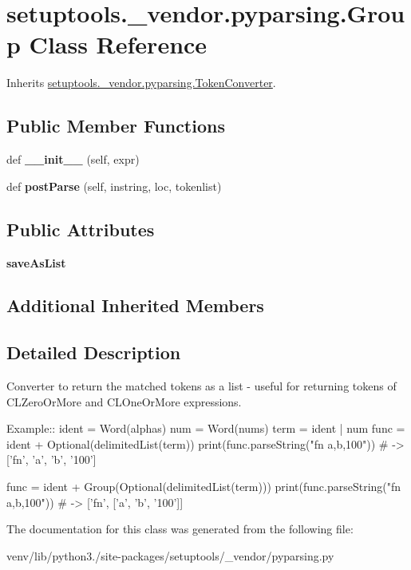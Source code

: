 \hypertarget{classsetuptools_1_1__vendor_1_1pyparsing_1_1_group}{}\section{setuptools.\+\_\+vendor.\+pyparsing.\+Group Class Reference}
\label{classsetuptools_1_1__vendor_1_1pyparsing_1_1_group}


Inherits \hyperlink{classsetuptools_1_1__vendor_1_1pyparsing_1_1_token_converter}{setuptools.\+\_\+vendor.\+pyparsing.\+Token\+Converter}.

\subsection*{Public Member Functions}
\begin{DoxyCompactItemize}
\item 
\mbox{\label{classsetuptools_1_1__vendor_1_1pyparsing_1_1_group_ac8ddd6ac40275611871ddf1ce6eaa6da}} 
def {\bfseries \+\_\+\+\_\+init\+\_\+\+\_\+} (self, expr)
\item 
\mbox{\label{classsetuptools_1_1__vendor_1_1pyparsing_1_1_group_a83c4ae0d82479b6fcac000adab3a3bc3}} 
def {\bfseries post\+Parse} (self, instring, loc, tokenlist)
\end{DoxyCompactItemize}
\subsection*{Public Attributes}
\begin{DoxyCompactItemize}
\item 
\mbox{\label{classsetuptools_1_1__vendor_1_1pyparsing_1_1_group_abb9329fa2f2c5c248c18b80cdd6f39c0}} 
{\bfseries save\+As\+List}
\end{DoxyCompactItemize}
\subsection*{Additional Inherited Members}


\subsection{Detailed Description}
\begin{DoxyVerb}Converter to return the matched tokens as a list - useful for returning tokens of C{L{ZeroOrMore}} and C{L{OneOrMore}} expressions.

Example::
    ident = Word(alphas)
    num = Word(nums)
    term = ident | num
    func = ident + Optional(delimitedList(term))
    print(func.parseString("fn a,b,100"))  # -> ['fn', 'a', 'b', '100']

    func = ident + Group(Optional(delimitedList(term)))
    print(func.parseString("fn a,b,100"))  # -> ['fn', ['a', 'b', '100']]
\end{DoxyVerb}
 

The documentation for this class was generated from the following file\+:\begin{DoxyCompactItemize}
\item 
venv/lib/python3./site-\/packages/setuptools/\+\_\+vendor/pyparsing.\+py\end{DoxyCompactItemize}
